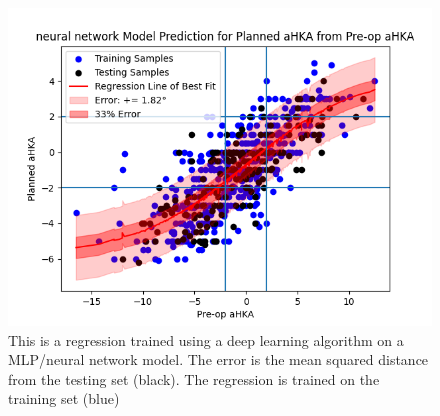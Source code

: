 \documentclass{article}
\begin{document}
\begin{figure}[h]
	\includegraphics[width=\textwidth]{neural_network_regression.png}
	\caption{This is a regression trained using a deep learning algorithm on a MLP/neural network model.
	The error is the mean squared distance from the testing set (black). 
	The regression is trained on the training set (blue)}
\end{figure}
\end{document}
